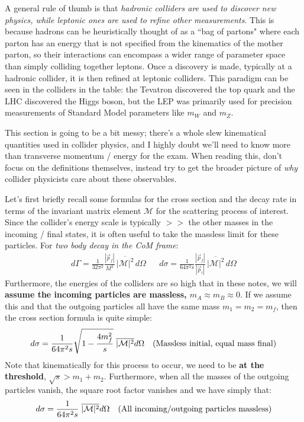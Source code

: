 \documentclass[11pt, oneside]{article}   	%
\theoremstyle{definition}
\numberwithin{equation}{subsection}		%
\begin{document}
A general rule of thumb is that \textit{hadronic colliders are used to discover new physics, while leptonic ones are used to refine other 
measurements}. This is because hadrons can be heuristically thought of as a ``bag of partons" where each parton has an energy that is not 
specified from the kinematics of the mother parton, so their interactions can encompass a wider range of parameter space than simply 
colliding together leptons. Once a discovery is made, typically at a hadronic collider, it is then refined at leptonic colliders. This paradigm 
can be seen in the colliders in the table: the Tevatron discovered the top quark and the LHC discovered the Higgs boson, but the LEP was 
primarily used for precision measurements of Standard Model parameters like $m_W$ and $m_Z$. 

This section is going to be a bit messy; there's a whole slew kinematical quantities used in collider physics, and I highly doubt we'll need to 
know more than transverse momentum / energy for the exam. When reading this, don't focus on the definitions themselves, instead try to 
get the broader picture of \textit{why} collider physicists care about these observables. 

Let's first briefly recall some formulas for the cross section and the decay rate in terms of the invariant matrix element $\mathcal M$ for the 
scattering process of interest. Since the collider's energy scale is typically $>>$ the other masses in the incoming / final states, it is 
often useful to take the massless limit for these particles. For \textit{two body decay in the CoM frame}:
\begin{align}
	d\Gamma = \frac{1}{32\pi^2} \frac{|\vec p_f|}{M^2}\,\overline{|\mathcal M|^2}\,d\Omega && 
	d\sigma = \frac{1}{64\pi^2 s}\frac{|\vec p_f|}{|\vec p_i|}\,\overline{|\mathcal M|^2}\,d\Omega  \nonumber
\end{align}
Furthermore, the energies of the colliders are so high that in these notes, we will \textbf{assume the incoming particles are massless, 
$m_A \approx m_B\approx 0$}. If we assume this and that the outgoing particles all have the same mass $m_1 = m_2 = m_f$, then 
the cross section formula is quite simple:
\begin{align}
	d\sigma = \frac{1}{64\pi^2 s}\sqrt{1 - \frac{4 m_f^2}{s}} \;\overline{|\mathcal M|^2} d\Omega && (\textnormal{Massless initial, equal mass 
	final}) 
\end{align}
Note that kinematically for this process to occur, we need to be \textbf{at the threshold}, $\sqrt s > m_1 + m_2$. Furthermore, when all the 
masses of the outgoing particles vanish, the square root factor vanishes and we have simply that:
\begin{align}
	d\sigma = \frac{1}{64\pi^2 s} \;\overline{|\mathcal M|^2} d\Omega && (\textnormal{All incoming/outgoing particles massless}) \nonumber
\end{align}
\end{document}

